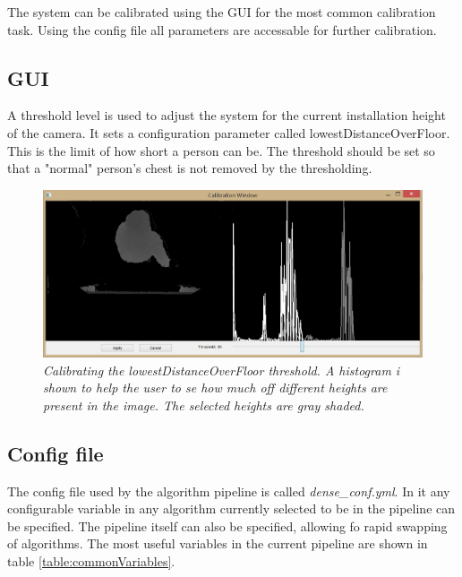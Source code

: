 The system can be calibrated using the GUI for the most common calibration task. Using the config file all parameters are accessable for further calibration.

\subsection{GUI}
A threshold level is used to adjust the system for the current installation height of the camera. It sets a configuration parameter called lowestDistanceOverFloor. This is the limit of how short a person can be. The threshold should be set so that a "normal" person’s chest is not removed by the thresholding.

\begin{figure}[htb]
	\centering
	\includegraphics[width=\linewidth]{images/Calibration.png}
	\caption[Overview of the entire system]{\textit{Calibrating the lowestDistanceOverFloor threshold. A histogram i shown to help the user to se how much off different heights are present in the image. The selected heights are gray shaded.}}
	\label{fig:lowestDistanceOverFloor_calibration}  %
\end{figure}

\newpage
\subsection{Config file}
The config file used by the algorithm pipeline is called \textit{dense\_conf.yml}. In it any configurable variable in any algorithm currently selected to be in the pipeline can be specified. The pipeline itself can also be specified, allowing fo rapid swapping of algorithms. The most useful variables in the current pipeline are shown in table \ref{table:commonVariables}.\\

